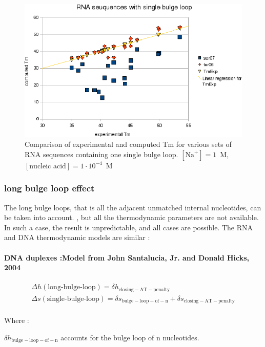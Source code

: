 \documentclass{article}
\begin{document}
\begin{figure}[h]
\includegraphics[width=1\linewidth]{images/RNASingleBulgeLoop}
\caption{Comparison of experimental and computed Tm for various sets of RNA sequences containing one single bulge loop. $[\mbox{Na}^+] = 1$~M, $[\mbox{nucleic acid}] = 1\cdot{}10^{-4}$~M}
\end{figure}

\clearpage
\subsubsection{long bulge loop effect}

The long bulge loops, that is all the adjacent unmatched internal nucleotides, can be taken into
account. , but all the thermodynamic parameters are not available. In such a case, 
the result is unpredictable, and all cases are possible. 
The RNA and DNA thermodynamic models are similar : 
  
\paragraph{DNA duplexes :\textbf{Model from John Santalucia, Jr. and Donald Hicks, 2004}} 

\begin{multline*}
\Delta h {(\mbox{long-bulge-loop})} =
\delta{}h_\mathrm{closing-AT-penalty}\\
\Delta s {(\mbox{single-bulge-loop})} =
\delta{}s_\mathrm{bulge-loop-of-n} +
\delta{}s_\mathrm{closing-AT-penalty}\\
\end{multline*}


Where :

$\delta{}h_\mathrm{bulge-loop-of-n}$ accounts for the bulge loop of n nucleotides.
\end{document}

